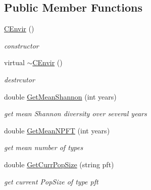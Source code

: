 \subsection*{Public Member Functions}
\begin{DoxyCompactItemize}
\item 
\mbox{\hyperlink{class_c_envir_ae4ba8d566cbfd0e6ae7066f88172e982}{C\+Envir}} ()
\begin{DoxyCompactList}\small\item\em constructor \end{DoxyCompactList}\item 
virtual \mbox{\hyperlink{class_c_envir_ad6755aa813da52b40a7c8a6a10030a73}{$\sim$\+C\+Envir}} ()
\begin{DoxyCompactList}\small\item\em destrcutor \end{DoxyCompactList}\item 
double \mbox{\hyperlink{class_c_envir_a4bc4e364b290d8c388bcdb04b352fb51}{Get\+Mean\+Shannon}} (int years)
\begin{DoxyCompactList}\small\item\em get mean Shannon diversity over several years \end{DoxyCompactList}\item 
double \mbox{\hyperlink{class_c_envir_ae5d8d6a172ebea8d8ce8d2e1b6c75ee7}{Get\+Mean\+N\+P\+FT}} (int years)
\begin{DoxyCompactList}\small\item\em get mean number of types \end{DoxyCompactList}\item 
double \mbox{\hyperlink{class_c_envir_ac680039ac2dad8a7df749a73b556d5fc}{Get\+Curr\+Pop\+Size}} (string pft)
\begin{DoxyCompactList}\small\item\em get current Pop\+Size of type pft \end{DoxyCompactList}\end{DoxyCompactItemize}
